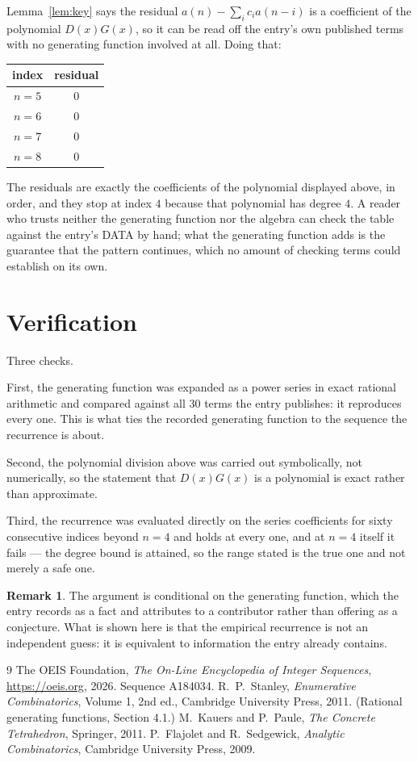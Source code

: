 \documentclass[11pt,a4paper]{article}
\theoremstyle{plain}
\theoremstyle{definition}
\newtheorem{remark}[theorem]{Remark}
\begin{document}
Lemma~\ref{lem:key} says the residual $a(n)-\sum_ic_ia(n-i)$ is a coefficient of the
polynomial $D(x)G(x)$, so it can be read off the entry's own published terms with no
generating function involved at all. Doing that:
\begin{center}
\begin{tabular}{cc}
index & residual \\ \hline
$n=5$ & $0$ \\
$n=6$ & $0$ \\
$n=7$ & $0$ \\
$n=8$ & $0$
\end{tabular}
\end{center}
The residuals are exactly the coefficients of the polynomial displayed above, in order, and
they stop at index $4$ because that polynomial has degree $4$. A reader who trusts
neither the generating function nor the algebra can check the table against the entry's DATA
by hand; what the generating function adds is the guarantee that the pattern continues, which
no amount of checking terms could establish on its own.

\section{Verification}

Three checks.

First, the generating function was expanded as a power series in exact rational arithmetic and
compared against all $30$ terms the entry publishes: it reproduces every one. This is
what ties the recorded generating function to the sequence the recurrence is about.

Second, the polynomial division above was carried out symbolically, not numerically, so the
statement that $D(x)G(x)$ is a polynomial is exact rather than approximate.

Third, the recurrence was evaluated directly on the series coefficients for sixty consecutive
indices beyond $n=4$ and holds at every one, and at $n=4$ itself it fails --- the
degree bound is attained, so the range stated is the true one and not merely a safe one.

\begin{remark}
The argument is conditional on the generating function, which the entry records as a fact and
attributes to a contributor rather than offering as a conjecture. What is shown here is that
the empirical recurrence is not an independent guess: it is equivalent to information the
entry already contains.
\end{remark}

\begin{thebibliography}{9}
 The OEIS Foundation, \emph{The On-Line Encyclopedia of Integer
Sequences}, \url{https://oeis.org}, 2026. Sequence A184034.
 R.~P.~Stanley, \emph{Enumerative Combinatorics}, Volume 1, 2nd ed.,
Cambridge University Press, 2011. (Rational generating functions, Section 4.1.)
 M.~Kauers and P.~Paule, \emph{The Concrete Tetrahedron}, Springer, 2011.
 P.~Flajolet and R.~Sedgewick, \emph{Analytic Combinatorics}, Cambridge
University Press, 2009.
\end{thebibliography}
\end{document}
